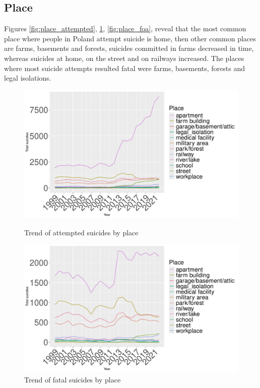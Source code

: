\documentclass{article}
\begin{document}
\subsection{Place}
%
%
Figures \ref{fig:place_attempted}, \ref{fig:place_fatal}, \ref{fig:place_foa},
reveal that the most common place where people in Poland attempt suicide is 
home, then other common places are farms, basements and forests,
suicides committed in farms decreased in time, whereas suicides at home,
on the street and on railways increased.
The places where most suicide attempts resulted fatal were farms,
basements, forests and legal isolations.
%
%
\begin{figure}[H]
    \centering
    \begin{minipage}{0.45\textwidth}
        \includegraphics[width=\textwidth]{imgs/place_attempted.pdf}
        \caption{Trend of attempted suicides by place }
	\label{fig:place_attempted}
    \end{minipage}
    \hfill
    \begin{minipage}{0.45\textwidth}
        \includegraphics[width=\textwidth]{imgs/place_fatal.pdf}
        \caption{Trend of fatal suicides by place }
	\label{fig:place_fatal}
    \end{minipage}
\end{figure}
\end{document}
